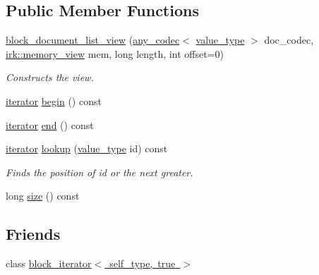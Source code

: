 \subsection*{Public Member Functions}
\begin{DoxyCompactItemize}
\item 
\mbox{\hyperlink{classirk_1_1index_1_1block__document__list__view_a62b936d45acb50d30f95120370e5457b}{block\+\_\+document\+\_\+list\+\_\+view}} (\mbox{\hyperlink{namespaceirk_a831a3a869cf19601dbfb5c41765a2e87}{any\+\_\+codec}}$<$ \mbox{\hyperlink{classirk_1_1index_1_1block__document__list__view_a0741459717c42674c1cfe069ee876344}{value\+\_\+type}} $>$ doc\+\_\+codec, \mbox{\hyperlink{classirk_1_1memory__view}{irk\+::memory\+\_\+view}} mem, long length, int offset=0)
\begin{DoxyCompactList}\small\item\em Constructs the view. \end{DoxyCompactList}\item 
\mbox{\hyperlink{classirk_1_1index_1_1block__document__list__view_ac9190c4c0eb1b9cc20a1b6a5fbea1d80}{iterator}} \mbox{\hyperlink{classirk_1_1index_1_1block__document__list__view_a6c320fd31232ebba37be70c0c9f682c4}{begin}} () const
\item 
\mbox{\hyperlink{classirk_1_1index_1_1block__document__list__view_ac9190c4c0eb1b9cc20a1b6a5fbea1d80}{iterator}} \mbox{\hyperlink{classirk_1_1index_1_1block__document__list__view_a1edd00780b264af57cadf53fadf2ced3}{end}} () const
\item 
\mbox{\hyperlink{classirk_1_1index_1_1block__document__list__view_ac9190c4c0eb1b9cc20a1b6a5fbea1d80}{iterator}} \mbox{\hyperlink{classirk_1_1index_1_1block__document__list__view_a550147f841ed69dc287660b996dc6a1f}{lookup}} (\mbox{\hyperlink{classirk_1_1index_1_1block__document__list__view_a0741459717c42674c1cfe069ee876344}{value\+\_\+type}} id) const
\begin{DoxyCompactList}\small\item\em Finds the position of {\ttfamily id} or the next greater. \end{DoxyCompactList}\item 
long \mbox{\hyperlink{classirk_1_1index_1_1block__document__list__view_ac531dcc96c79705a76cbe2f0bf5a0d99}{size}} () const
\end{DoxyCompactItemize}
\subsection*{Friends}
\begin{DoxyCompactItemize}
\item 
class \mbox{\hyperlink{classirk_1_1index_1_1block__document__list__view_a9e9d706e71ebb8b3d20137fb0121c8bd}{block\+\_\+iterator$<$ self\+\_\+type, true $>$}}
\end{DoxyCompactItemize}


